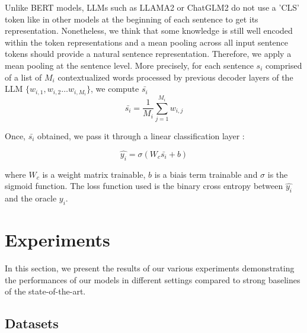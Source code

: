 Unlike BERT models, LLMs such as LLAMA2 or ChatGLM2 do not use a 'CLS' token like in other models at the beginning of each sentence to get its representation. Nonetheless, we think that some knowledge is still well encoded within the token representations and a mean pooling across all input sentence tokens should provide a natural sentence representation\cite{ni-etal-2022-sentence}. Therefore, we apply a mean pooling at the sentence level. More precisely, for each sentence $s_i$ comprised of a list of $M_i$ contextualized words processed by previous decoder layers of the LLM $\{w_{i,1},w_{i,2} \dots w_{i,M_i}\}$, we compute $\bar{s_i}$
\begin{equation}
\bar{s_i} = \frac{1}{M_i} \sum_{j=1}^{M_i} w_{i,j}    
\end{equation}

Once, $\bar{s_i}$ obtained, we pass it through a linear classification layer :

\begin{equation}
    \hat{y_i} = \sigma(W_c \bar{s_i} + b)
\end{equation}

where $W_c$ is a weight matrix trainable, $b$ is a biais term trainable and $\sigma$ is the sigmoid function. The loss function used is the binary cross entropy between $\hat{y_i}$ and the oracle $y_i$.

\section{Experiments}

In this section, we present the results of our various experiments demonstrating the performances of our models in different settings compared to strong baselines of the state-of-the-art. %

\subsection{Datasets}

